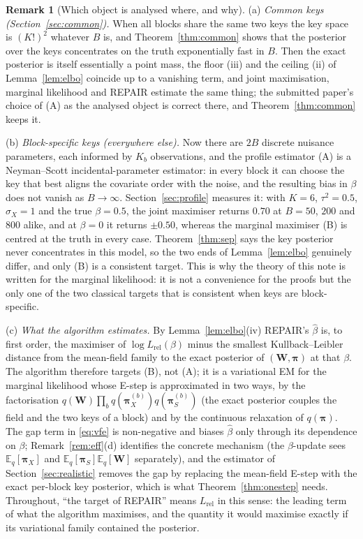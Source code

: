 \documentclass[11pt]{article}
\theoremstyle{definition}
\newtheorem{remark}{Remark}
\newcommand{\bW}{\mathbf{W}}
\newcommand{\bpi}{\boldsymbol{\pi}}
\newcommand{\E}{\mathbb{E}}
\newcommand{\rel}{\mathrm{rel}}
\begin{document}
\begin{remark}[Which object is analysed where, and why]\label{rem:targets}
(a) \emph{Common keys (Section~\ref{sec:common}).} When all blocks share the same two keys the key space is $(K!)^2$ whatever $B$ is, and Theorem~\ref{thm:common} shows that the posterior over the keys concentrates on the truth exponentially fast in $B$. Then the exact posterior is itself essentially a point mass, the floor (iii) and the ceiling (ii) of Lemma~\ref{lem:elbo} coincide up to a vanishing term, and joint maximisation, marginal likelihood and REPAIR estimate the same thing; the submitted paper's choice of (A) as the analysed object is correct there, and Theorem~\ref{thm:common} keeps it.

(b) \emph{Block-specific keys (everywhere else).} Now there are $2B$ discrete nuisance parameters, each informed by $K_b$ observations, and the profile estimator (A) is a Neyman--Scott incidental-parameter estimator: in every block it can choose the key that best aligns the covariate order with the noise, and the resulting bias in $\beta$ does not vanish as $B\to\infty$. Section~\ref{sec:profile} measures it: with $K=6$, $\tau^2=0.5$, $\sigma_X=1$ and the true $\beta=0.5$, the joint maximiser returns $0.70$ at $B=50$, $200$ and $800$ alike, and at $\beta=0$ it returns $\pm0.50$, whereas the marginal maximiser (B) is centred at the truth in every case. Theorem~\ref{thm:sep} says the key posterior never concentrates in this model, so the two ends of Lemma~\ref{lem:elbo} genuinely differ, and only (B) is a consistent target. This is why the theory of this note is written for the marginal likelihood: it is not a convenience for the proofs but the only one of the two classical targets that is consistent when keys are block-specific.

(c) \emph{What the algorithm estimates.} By Lemma~\ref{lem:elbo}(iv) REPAIR's $\hat\beta$ is, to first order, the maximiser of $\log L_\rel(\beta)$ minus the smallest Kullback--Leibler distance from the mean-field family to the exact posterior of $(\bW,\bpi)$ at that $\beta$. The algorithm therefore targets (B), not (A); it is a variational EM for the marginal likelihood whose E-step is approximated in two ways, by the factorisation $q(\bW)\prod_bq(\bpi_X^{(b)})q(\bpi_S^{(b)})$ (the exact posterior couples the field and the two keys of a block) and by the continuous relaxation of $q(\bpi)$. The gap term in \eqref{eq:vfe} is non-negative and biases $\hat\beta$ only through its dependence on $\beta$; Remark~\ref{rem:eff}(d) identifies the concrete mechanism (the $\beta$-update sees $\E_q[\bpi_X]$ and $\E_q[\bpi_S]\E_q[\bW]$ separately), and the estimator of Section~\ref{sec:realistic} removes the gap by replacing the mean-field E-step with the exact per-block key posterior, which is what Theorem~\ref{thm:onestep} needs. Throughout, ``the target of REPAIR'' means $L_\rel$ in this sense: the leading term of what the algorithm maximises, and the quantity it would maximise exactly if its variational family contained the posterior.
\end{remark}
\end{document}
